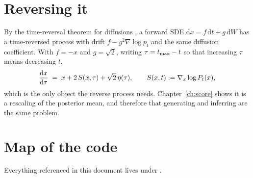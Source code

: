 \section{Reversing it}
\label{sec:reverse}

By the time-reversal theorem for diffusions \citep{anderson1982reverse,haussmann1986}, a forward SDE
$\mathrm{d}x = f\,\mathrm{d}t + g\,\mathrm{d}W$ has a time-reversed process with drift
$f - g^2\nabla\log p_t$ and the same diffusion coefficient. With $f=-x$ and $g=\sqrt2$, writing
$\tau = t_{\max} - t$ so that increasing $\tau$ means decreasing $t$,
\begin{equation}
\label{eq:reverse}
\frac{\mathrm{d}x}{\mathrm{d}\tau} \;=\; x + 2\,S(x,\tau) + \sqrt{2}\,\mathbf{\eta}(\tau),
\qquad S(x,t) := \nabla_x \log P_t(x),
\end{equation}
which is the only object the reverse process needs. Chapter~\ref{ch:score} shows it is a
rescaling of the posterior mean, and therefore that generating and inferring are the same
problem.

\section{Map of the code}
\label{sec:codemap}

Everything referenced in this document lives under .

